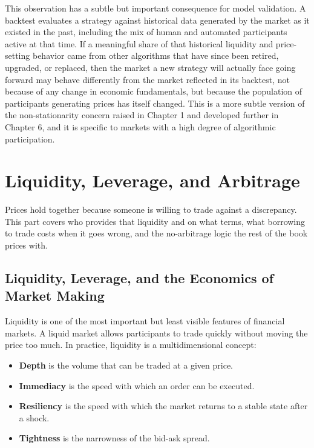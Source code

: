 \documentclass[../ai_in_finance]{subfiles}
\begin{document}
This observation has a subtle but important consequence for model validation. A backtest evaluates a strategy against historical data generated by the market as it existed in the past, including the mix of human and automated participants active at that time. If a meaningful share of that historical liquidity and price-setting behavior came from other algorithms that have since been retired, upgraded, or replaced, then the market a new strategy will actually face going forward may behave differently from the market reflected in its backtest, not because of any change in economic fundamentals, but because the population of participants generating prices has itself changed. This is a more subtle version of the non-stationarity concern raised in Chapter 1 and developed further in Chapter 6, and it is specific to markets with a high degree of algorithmic participation.

\section{Liquidity, Leverage, and Arbitrage}

Prices hold together because someone is willing to trade against a discrepancy. This part covers who provides that liquidity and on what terms, what borrowing to trade costs when it goes wrong, and the no-arbitrage logic the rest of the book prices with.

\subsection{Liquidity, Leverage, and the Economics of Market Making}
\label{sec:market-making}

Liquidity is one of the most important but least visible features of financial markets. A liquid market allows participants to trade quickly without moving the price too much. In practice, liquidity is a multidimensional concept:

\begin{itemize}
    \item \textbf{Depth} is the volume that can be traded at a given price.
    \item \textbf{Immediacy} is the speed with which an order can be executed.
    \item \textbf{Resiliency} is the speed with which the market returns to a stable state after a shock.
    \item \textbf{Tightness} is the narrowness of the bid-ask spread.
\end{itemize}
\end{document}
